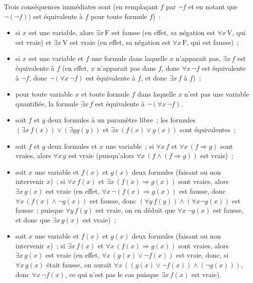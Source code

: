 Trois conséquences immédiates sont (en remplaçant $f$ par $\neg f$ et en notant que $\neg (\neg f))$ est équivalente à $f$ pour toute formule $f$) : 
\begin{itemize}
    \item si $x$ est une variable, alors $\exists x \, \mathrm{F}$ est fausse (en effet, sa négation est $\forall x \, \mathrm{V}$, qui est vraie) et $\exists x \, \mathrm{V}$ est vraie (en effet, sa négation est $\forall x \, \mathrm{F}$, qui est fausse) ; 
    \item si $x$ est une variable et $f$ une formule dans laquelle $x$ n'apparait pas, $\exists x \, f$ est équivalente à $f$ (en effet, $x$ n'apparait pas dans $f$, donc $\forall x \, \neg f$ est équivalente à $\neg f$, donc $\neg (\forall x \, \neg f)$ est équivalente à $f$, et donc $\exists x \, f$ à $f$) ; 
    \item pour toute variable $x$ et toute formule $f$ dans laquelle $x$ n'est pas une variable quantifiée, la formule $\exists x \, f$ est équivalente à $\neg (\forall x \, \neg f)$.
    \item soit $f$ et $g$ deux formules à un paramètre libre ; les formules $(\exists x \, f(x)) \vee (\exists y g(y))$ et $\exists x \, (f(x) \vee g(x))$ sont équivalentes ;
    \item soit $f$ et $g$ deux formules et $x$ une variable ; si $\forall x \, f$ et $\forall x \, (f \Rightarrow g)$ sont vraies, alors $\forall x \, g$ est vraie (puisqu'alors $\forall x \, (f \wedge (f \Rightarrow g))$ est vrais) ; 
    \item soit $x$ une variable et $f(x)$ et $g(x)$ deux formules (faisant ou non intervenir $x$) ; si $\forall x \, f(x)$ et $\exists x \, (f(x) \Rightarrow g(x))$ sont vraies, alors $\exists x \, g(x)$ est vraie (en effet, $\forall x \, \neg (f(x) \Rightarrow g(x))$ est fausse, donc $\forall x \, (f(x) \wedge \neg g(x))$ est fausse, donc $(\forall y \, f(y)) \wedge (\forall x \neg g(x))$ est fausse ; puisque $\forall y \, f(y)$ est vraie, on en déduit que $\forall x \, \neg g(x)$ est fausse, et donc que $\exists x \, g(x)$ est vraie) ; 
    \item soit $x$ une variable et $f(x)$ et $g(x)$ deux formules (faisant ou non intervenir $x$) ; si $\exists x \, f(x)$ et $\forall x \, (f(x) \Rightarrow g(x))$ sont vraies, alors $\exists x \, g(x)$ est vraie (en effet, $\forall x \, (g(x) \vee \neg f(x))$ est vraie, donc, si $\forall x \, g(x)$ était fausse, on aurait $\forall x \, ((g(x) \vee \neg f(x)) \wedge (\neg g(x)))$, donc $\forall x \, \neg f(x)$, ce qui n'est pas le cas puisque $\exists x \, f(x)$ est vraie). 
\end{itemize}

